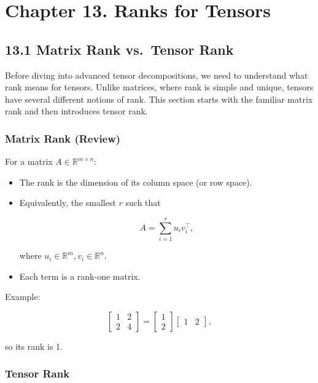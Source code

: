\documentclass[
  letterpaper,
  DIV=11,
  numbers=noendperiod]{scrreprt}
\begin{document}
\section{Chapter 13. Ranks for
Tensors}\label{chapter-13.-ranks-for-tensors}

\subsection{13.1 Matrix Rank vs.~Tensor
Rank}\label{matrix-rank-vs.-tensor-rank}

Before diving into advanced tensor decompositions, we need to understand
what rank means for tensors. Unlike matrices, where rank is simple and
unique, tensors have several different notions of rank. This section
starts with the familiar matrix rank and then introduces tensor rank.

\subsubsection{Matrix Rank (Review)}\label{matrix-rank-review}

For a matrix \(A \in \mathbb{R}^{m \times n}\):

\begin{itemize}
\item
  The rank is the dimension of its column space (or row space).
\item
  Equivalently, the smallest \(r\) such that

  \[
  A = \sum_{i=1}^r u_i v_i^\top,
  \]

  where \(u_i \in \mathbb{R}^m, v_i \in \mathbb{R}^n\).
\item
  Each term is a rank-one matrix.
\end{itemize}

Example:

\[
\begin{bmatrix}1 & 2 \\ 2 & 4\end{bmatrix}
= \begin{bmatrix}1 \\ 2\end{bmatrix} \begin{bmatrix}1 & 2\end{bmatrix},
\]

so its rank is 1.

\subsubsection{Tensor Rank}\label{tensor-rank}
\end{document}
